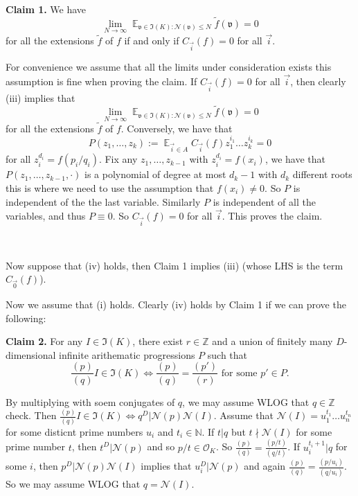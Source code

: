 \documentclass[11pt]{amsart}
\theoremstyle{definition}
\DeclareMathOperator*{\E}{\mathbb{E}}
\newcommand{\N}{{\mathbb N}}
\newcommand{\NN}{{\mathcal N}}
\newcommand{\Z}{{\mathbb Z}}
\begin{document}
\textbf{Claim 1.} We have $$\lim_{N\to\infty}\E_{\mathfrak{v}\in \mathfrak{I}(K)\colon \NN(\mathfrak{v})\leq N}\tilde{f}(\mathfrak{v})=0$$
for all the extensions $\tilde{f}$ of $f$
if and only if $C_{\vec{i}}(f)=0$ for all $\vec{i}$.

For convenience we assume that all the limits under consideration exists {\color{red} this assumption is fine when proving the claim.}
If $C_{\vec{i}}(f)=0$ for all $\vec{i}$, then clearly (iii) implies that $$\lim_{N\to\infty}\E_{\mathfrak{v}\in \mathfrak{I}(K)\colon \NN(\mathfrak{v})\leq N}\tilde{f}(\mathfrak{v})=0$$
for all the extensions $\tilde{f}$ of $f$. Conversely, we have that 
$$P(z_{1},\dots,z_{k}):=\E_{\vec{i}\in A}C_{\vec{i}}(f)z_{1}^{i_{1}}\dots z_{k}^{i_{k}}=0$$
for all $z_{i}^{d_{i}}=f(p_{i}/q_{i})$.
Fix any $z_{1},\dots,z_{k-1}$ with $z_{i}^{d_{i}}=f(x_{i})$, we have that $P(z_{1},\dots,z_{k-1},\cdot)$ is a polynomial of degree at most $d_{k}-1$ with $d_{k}$ different roots {\color{red} this is where we need to use the assumption that $f(x_{i})\neq 0$}. So $P$ is independent of the the last variable. Similarly $P$ is independent of all the variables, and thus $P\equiv 0$. So $C_{\vec{i}}(f)=0$ for all $\vec{i}$. This proves the claim.

\

Now suppose that (iv) holds, then Claim 1 implies (iii) (whose LHS is the term $C_{\vec{0}}(f)$).


Now we assume that (i) holds. Clearly (iv) holds by Claim 1 if we can prove the following:

\textbf{Claim 2.} For any $I\in\mathfrak{I}(K)$, there exist $r\in\Z$ and a union of finitely many $D$-dimensional infinite arithematic progressions $P$ such that 
$$\frac{(p)}{(q)}I\in\mathfrak{I}(K)\Leftrightarrow \frac{(p)}{(q)}=\frac{(p')}{(r)} \text{ for some } p'\in P.$$

By multiplying with soem conjugates of $q$, we may assume WLOG that $q\in\Z$ {\color{red} check}. Then $\frac{(p)}{(q)}I\in\mathfrak{I}(K)\Leftrightarrow q^{D}\vert\NN(p)\NN(I)$.
Assume that $\NN(I)=u_{1}^{t_{1}}\dots u_{n}^{t_{n}}$ for some disticnt prime numbers $u_{i}$ and $t_{i}\in\N$. 
If $t\vert q$ but $t\nmid \NN(I)$ for some prime number $t$, then $t^{D}\vert \NN(p)$ and so $p/t\in\mathcal{O}_{K}$. So $\frac{(p)}{(q)}=\frac{(p/t)}{(q/t)}$. If $u_{i}^{t_{i}+1}\vert q$ for some $i$, then $p^{D}\vert\NN(p)\NN(I)$ implies that $u_{i}^{D}\vert \NN(p)$ and again $\frac{(p)}{(q)}=\frac{(p/u_{i})}{(q/u_{i})}$.
So we may assume WLOG that $q=\NN(I)$.
\end{document}
